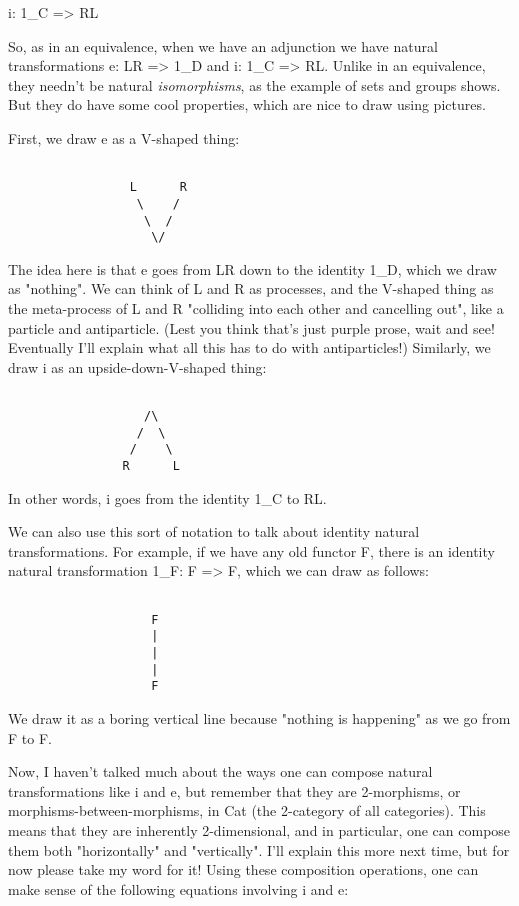 i: 1_{C} => RL

So, as in an equivalence, when we have an adjunction we have natural
transformations e: LR => 1_{D} and i: 1_{C} => RL.
Unlike in an equivalence, they needn't be natural \emph{isomorphisms},
as the example of sets and groups shows.  But they do have some cool
properties, which are nice to draw using pictures.

First, we draw e as a V-shaped thing:


\begin{verbatim}

                 L      R
                  \    /
                   \  / 
                    \/

\end{verbatim}
    
The idea here is that e goes from LR down to the identity 1_{D}, which we
draw as "nothing".  We can think of L and R as processes, and the
V-shaped thing as the meta-process of L and R "colliding into each other
and cancelling out", like a particle and antiparticle.  (Lest you think
that's just purple prose, wait and see!  Eventually I'll explain what
all this has to do with antiparticles!)  Similarly, we draw i as an
upside-down-V-shaped thing:


\begin{verbatim}

                   /\
                  /  \
                 /    \
                R      L

\end{verbatim}
    
In other words, i goes from the identity 1_{C} to RL.  

We can also use this sort of notation to talk about identity natural
transformations.  For example, if we have any old functor F, there is
an identity natural transformation 1_{F}: F => F, which we can draw as
follows:


\begin{verbatim}

                    F
                    |
                    |
                    |
                    F

\end{verbatim}
    
We draw it as a boring vertical line because "nothing is happening" as
we go from F to F.

Now, I haven't talked much about the ways one can compose natural
transformations like i and e, but remember that they are 2-morphisms,
or morphisms-between-morphisms, in Cat (the 2-category of all
categories).   This means that they are inherently 2-dimensional, and in
particular, one can compose them both "horizontally" and "vertically".
I'll explain this more next time, but for now please take my word for
it!  Using these composition operations, one can make sense of the
following equations involving i and e:
                   

